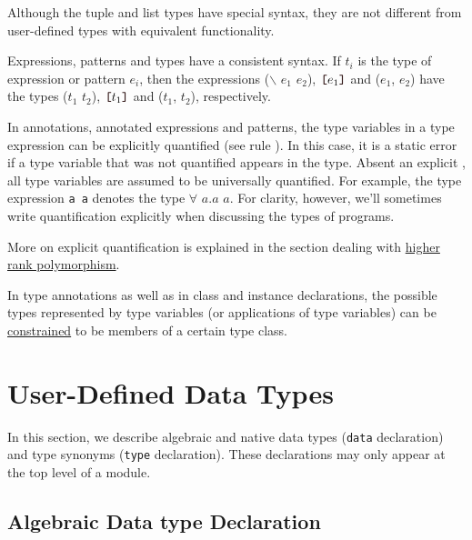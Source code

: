 Although the tuple and list types have special syntax, they are not different from user-defined types with equivalent functionality.

Expressions, patterns and types have a consistent syntax. If $t_i$ is the type of expression or pattern $e_i$, then the expressions
($\backslash$ $e_1$ \arrow{} $e_2$),
$\bracka{}e_1\brackz{}$
and ($e_1$, $e_2$) have the types
($t_1$ \arrow{} $t_2$), $\bracka{}t_1\brackz{}$ and ($t_1$, $t_2$),
respectively.

In annotations, annotated expressions and patterns, the type variables in a type expression can be explicitly  quantified (see rule ). In this case, it is a static error if a type variable that was not quantified appears in the type.
Absent an explicit , all type variables are assumed to be universally quantified. For example, the type expression \texttt{a \arrow{} a} denotes the type $\forall$ $a$.$a$ \arrow{} $a$.
For clarity, however, we'll sometimes write quantification explicitly when discussing the types of \frege{} programs.

More on explicit quantification is explained in the section dealing with \hyperref[higher-rank]{higher rank polymorphism}.

In type annotations as well as in class and instance declarations, the possible types represented by type variables (or applications of type variables) can be \hyperref[constraint]{constrained} to be members of a certain type class. 

\section{User-Defined Data Types}   

In this section, we describe algebraic and native data types (\texttt{data} declaration) and type synonyms (\texttt{type} declaration). These declarations may only appear at the top level of a module.

\subsection{Algebraic Data type Declaration}   \label{algdcl}

\begin{flushleft}
     \sym{=}  \\
 \\
   
  \alt\    \bracea{} \bracez{}\\
 \\
\end{flushleft}

